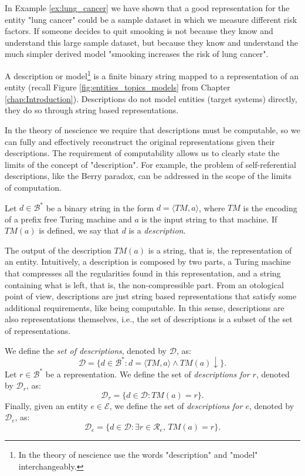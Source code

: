 \begin{example}
In Example \ref{ex:lung_cancer} we have shown that a good representation for the entity "lung cancer" could be a sample dataset in which we measure different risk factors. If someone decides to quit smooking is not because they know and understand this large sample dataset, but because they know and understand the much simpler derived model "smooking increases the risk of lung cancer".
\end{example}

A description or model\footnote{In the theory of nescience use the words "description" and "model" interchangeably.} is a finite binary string mapped to a representation of an entity (recall Figure \ref{fig:entities_topics_models} from Chapter \ref{chap:Introduction}). Descriptions do not model entities (target systems) directly, they do so through string based representations.

In the theory of nescience we require that descriptions must be computable, so we can fully and effectively reconstruct the original representations given their descriptions. The requirement of computability allows us to clearly state the limits of the concept of "description". For example, the problem of self-referential descriptions, like the Berry paradox, can be addressed in the scope of the limits of computation.

\begin{definition} [Model]
\label{def:descriptions_model}
Let $d \in \mathcal{B}^\ast$ be a binary string in the form $d = \langle TM,a \rangle$, where $TM$ is the encoding of a prefix free Turing machine and $a$ is the input string to that machine. If $TM(a)$ is defined, we say that $d$ is a \emph{description}. 
\end{definition}

The output of the description $TM(a)$ is a string, that is, the representation of an entity. Intuitively, a description is composed by two parts, a Turing machine that compresses all the regularities found in this representation, and a string containing what is left, that is, the non-compressible part. From an otological point of view, descriptions are just string based representations that satisfy some additional requirements, like being computable. In this sense, descriptions are also representations themselves, i.e., the set of descriptions is a subset of the set of representations.

\begin{definition}
\label{def:descriptions_model}
We define the \emph{set of descriptions}, denoted by $\mathcal{D}$, as:
\[
\mathcal{D} = \{ d \in \mathcal{B}^\ast : d = \langle TM,a \rangle \wedge TM(a) \downarrow \}.
\]
Let $r \in \mathcal{B}^\ast$ be a representation. We define the set of \emph{descriptions for $r$}, denoted by $\mathcal{D}_r$, as:
\[
\mathcal{D}_r = \{ d \in \mathcal{D} : TM(a) = r \}.
\]
Finally, given an entity $e \in \mathcal{E}$, we define the set of \emph{descriptions for $e$}, denoted by $\mathcal{D}_e$, as:
\[
\mathcal{D}_e = \{ d \in \mathcal{D} : \exists r \in \mathcal{R}_e,\, TM(a) = r \}.
\]
\end{definition}

